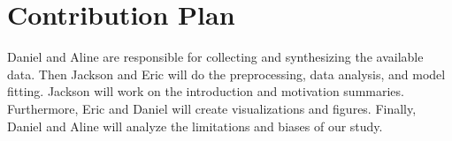 \documentclass{article}
\theoremstyle{plain}
\theoremstyle{definition}
\theoremstyle{remark}
\begin{document}
\section{Contribution Plan}


Daniel and Aline are responsible for collecting and synthesizing the available data. Then Jackson and Eric will do the preprocessing, data analysis, and model fitting. Jackson will work on the introduction and motivation summaries. Furthermore, Eric and Daniel will create visualizations and figures. Finally, Daniel and Aline will analyze the limitations and biases of our study. 





\end{document}
